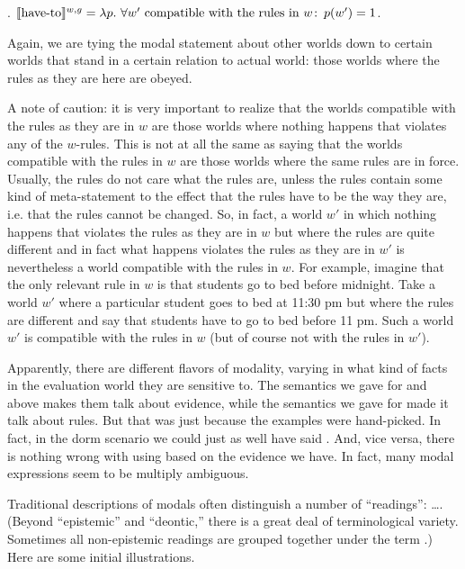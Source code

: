 \ex. $\sv{\mbox{have-to}}^{w,g} = \lambda p.\ \forall w' \mbox{ compatible with the rules in } w\co p(w') = 1$.

Again, we are tying the modal statement about other worlds down to certain worlds that stand in a certain relation to actual world: those worlds where the rules as they are here are obeyed.

A note of caution: it is very important to realize that the worlds compatible with the rules as they are in $w$ are those worlds where nothing happens that violates any of the $w$-rules. This is not at all the same as saying that the worlds compatible with the rules in $w$ are those worlds where the same rules are in force. Usually, the rules do not care what the rules are, unless the rules contain some kind of meta-statement to the effect that the rules have to be the way they are, i.e. that the rules cannot be changed. So, in fact, a world $w'$ in which nothing happens that violates the rules as they are in $w$ but where the rules are quite different and in fact what happens violates the rules as they are in $w'$ is nevertheless a world compatible with the rules in $w$. For example, imagine that the only relevant rule in $w$ is that students go to bed before midnight. Take a world $w'$ where a particular student goes to bed at 11:30 pm but where the rules are different and say that students have to go to bed before 11 pm. Such a world $w'$ is compatible with the rules in $w$ (but of course not with the rules in $w'$).

Apparently, there are different flavors of modality, varying in what kind of facts in the evaluation world they are sensitive to. The semantics we gave for  and  above makes them talk about evidence, while the semantics we gave for  made it talk about rules. But that was just because the examples were hand-picked. In fact, in the dorm scenario we could just as well have said . And, vice versa, there is nothing wrong with using  based on the evidence we have. In fact, many modal expressions seem to be multiply ambiguous.

Traditional descriptions of modals often distinguish a number of ``readings'':  \dots. (Beyond ``epistemic'' and ``deontic,'' there is a great deal of terminological variety. Sometimes all non-epistemic readings are grouped together under the term .) Here are some initial illustrations.

